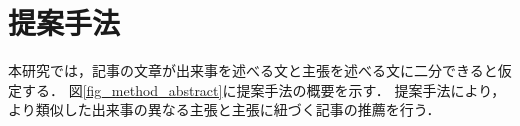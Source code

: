 \documentclass[12pt,a4j]{jreport}
\begin{document}




\chapter{提案手法}
\label{chapter_method}

本研究では，記事の文章が出来事を述べる文と主張を述べる文に二分できると仮定する．
図\ref{fig_method_abstract}に提案手法の概要を示す．
提案手法により，より類似した出来事の異なる主張と主張に紐づく記事の推薦を行う．
\end{document}
